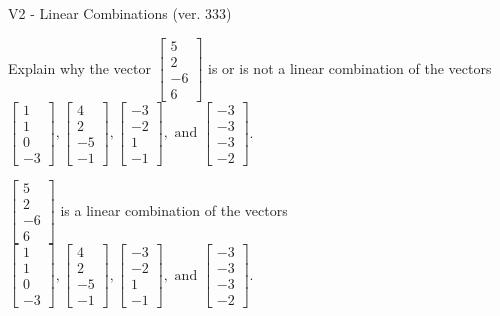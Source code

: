 \begin{exercise}
  \begin{exerciseTitle}V2 - Linear Combinations (ver. 333)\end{exerciseTitle}
  \begin{exerciseStatement}
    Explain why the vector \(\left[\begin{array}{c}
5 \\
2 \\
-6 \\
6
\end{array}\right]\)  is or is not a linear 
	combination of the vectors \(\left[\begin{array}{c}
1 \\
1 \\
0 \\
-3
\end{array}\right] , \left[\begin{array}{c}
4 \\
2 \\
-5 \\
-1
\end{array}\right] , \left[\begin{array}{c}
-3 \\
-2 \\
1 \\
-1
\end{array}\right] , \text{ and } \left[\begin{array}{c}
-3 \\
-3 \\
-3 \\
-2
\end{array}\right]\).
	


  \end{exerciseStatement}
  \begin{exerciseAnswer}
   \(\left[\begin{array}{c}
5 \\
2 \\
-6 \\
6
\end{array}\right]\) 
  	 is  
	a linear combination of the vectors \(\left[\begin{array}{c}
1 \\
1 \\
0 \\
-3
\end{array}\right] , \left[\begin{array}{c}
4 \\
2 \\
-5 \\
-1
\end{array}\right] , \left[\begin{array}{c}
-3 \\
-2 \\
1 \\
-1
\end{array}\right] , \text{ and } \left[\begin{array}{c}
-3 \\
-3 \\
-3 \\
-2
\end{array}\right]\).


\end{exerciseAnswer}
\end{exercise}
